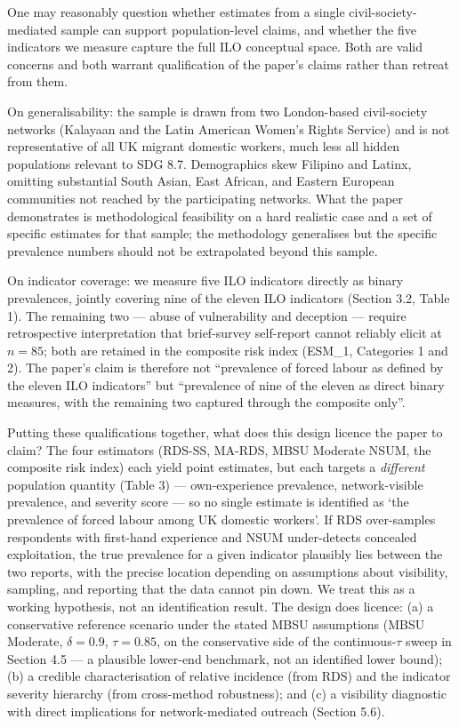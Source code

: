 \documentclass[
  12pt,
  letterpaper,
  DIV=11,
  numbers=noendperiod]{scrartcl}
\begin{document}
One may reasonably question whether estimates from a single
civil-society-mediated sample can support population-level claims, and
whether the five indicators we measure capture the full ILO conceptual
space. Both are valid concerns and both warrant qualification of the
paper's claims rather than retreat from them.

On generalisability: the sample is drawn from two London-based
civil-society networks (Kalayaan and the Latin American Women's Rights
Service) and is not representative of all UK migrant domestic workers,
much less all hidden populations relevant to SDG 8.7. Demographics skew
Filipino and Latinx, omitting substantial South Asian, East African, and
Eastern European communities not reached by the participating networks.
What the paper demonstrates is methodological feasibility on a hard
realistic case and a set of specific estimates for that sample; the
methodology generalises but the specific prevalence numbers should not
be extrapolated beyond this sample.

On indicator coverage: we measure five ILO indicators directly as binary
prevalences, jointly covering nine of the eleven ILO indicators (Section
3.2, Table 1). The remaining two --- abuse of vulnerability and
deception --- require retrospective interpretation that brief-survey
self-report cannot reliably elicit at \(n = 85\); both are retained in
the composite risk index (ESM\_1, Categories 1 and 2). The paper's claim
is therefore not ``prevalence of forced labour as defined by the eleven
ILO indicators'' but ``prevalence of nine of the eleven as direct binary
measures, with the remaining two captured through the composite only''.

Putting these qualifications together, what does this design licence the
paper to claim? The four estimators (RDS-SS, MA-RDS, MBSU Moderate NSUM,
the composite risk index) each yield point estimates, but each targets a
\emph{different} population quantity (Table 3) --- own-experience
prevalence, network-visible prevalence, and severity score --- so no
single estimate is identified as `the prevalence of forced labour among
UK domestic workers'. If RDS over-samples respondents with first-hand
experience and NSUM under-detects concealed exploitation, the true
prevalence for a given indicator plausibly lies between the two reports,
with the precise location depending on assumptions about visibility,
sampling, and reporting that the data cannot pin down. We treat this as
a working hypothesis, not an identification result. The design does
licence: (a) a conservative reference scenario under the stated MBSU
assumptions (MBSU Moderate, \(\delta = 0.9\), \(\tau = 0.85\), on the
conservative side of the continuous-\(\tau\) sweep in Section 4.5 --- a
plausible lower-end benchmark, not an identified lower bound); (b) a
credible characterisation of relative incidence (from RDS) and the
indicator severity hierarchy (from cross-method robustness); and (c) a
visibility diagnostic with direct implications for network-mediated
outreach (Section 5.6).
\end{document}
